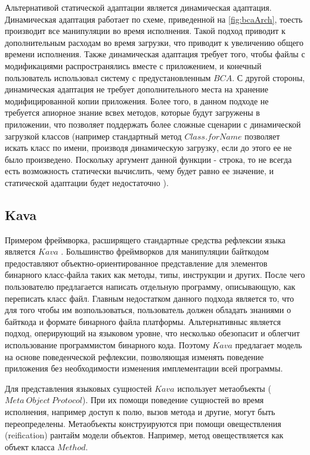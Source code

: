 Альтернативой статической адаптации является динамическая адаптация. Динамическая адаптация работает по схеме, приведенной на \autoref{fig:bcaArch}, тоесть производит все манипуляции во время исполнения. Такой подход приводит к дополнительным расходам во время загрузки, что приводит к увеличению общего времени исполнения. Также динамическая адаптация требует того, чтобы файлы с модификациями распространялись вместе с приложением, и конечный пользователь использовал систему с предустановленным $BCA$. С другой стороны, динамическая адаптация не требует дополнительного места на хранение модифицированной копии приложения. Более того, в данном подходе не требуется апиорное знание всвех методов, которые будут загружены в приложении, что позволяет поддержать более сложные сценарии с динамической загрузкой классов (например стандартный метод $Class.forName$ позволяет искать класс по имени, производя динамическую загрузку, если до этого ее не было произведено. Поскольку аргумент данной функции - строка, то не всегда есть возможность статически вычислить, чему будет равно ее значение, и статической адаптации будет недостаточно \cite{bca}).

\subsection{Kava}

Примером фреймворка, расширящего стандартные средства рефлексии языка является $Kava$ \cite{kava1} \cite{kava2}. Большинство фреймворков для манипуляции байткодом предоставляют объектно-ориентированное представление для элементов бинарного класс-файла таких как методы, типы, инструкции и других. После чего пользователю предлагается написать отдельную программу, описывающую, как переписать класс файл. Главным недостатком данного подхода является то, что для того чтобы им возпользоваться, пользователь должен обладать знаниями о байткода и формате бинарного файла платформы. Альтернативныс является подход, оперирующий на языковом уровне, что несколько обезопасит и облегчит использование программистом бинарного кода. Поэтому $Kava$ предлагает модель на основе поведенческой рефлексии, позволяющая изменять поведение приложения без необходимости изменения имплементации всей программы.

Для представления языковых сущностей $Kava$ использует метаобъекты ($Meta~Object~Protocol$). При их помощи поведение сущностей во время исполнения, например доступ к полю, вызов метода и другие, могут быть переопределены. Метаобъекты конструируются при помощи овеществления (reification) рантайм модели объектов. Например, метод овеществляется как объект класса $Method$.

